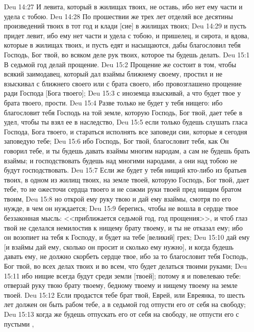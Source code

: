\vs Deu 14:27 И левита, который в жилищах твоих, не оставь, ибо нет ему части и удела с тобою.
\vs Deu 14:28 По прошествии же трех лет отделяй все десятины произведений твоих в тот год и клади [сие] в жилищах твоих;
\vs Deu 14:29 и пусть придет левит, ибо ему нет части и удела с тобою, и пришелец, и сирота, и вдова, которые  в жилищах твоих, и пусть едят и насыщаются, дабы благословил тебя Господь, Бог твой, во всяком деле рук твоих, которое ты будешь делать.
\vs Deu 15:1 В седьмой год делай прощение.
\vs Deu 15:2 Прощение же состоит в том, чтобы всякий заимодавец, который дал взаймы ближнему своему, простил  и не взыскивал с ближнего своего или с брата своего, ибо провозглашено прощение ради Господа [Бога твоего];
\vs Deu 15:3 с иноземца взыскивай, а что будет твое у брата твоего, прости.
\vs Deu 15:4 Разве только не будет у тебя нищего: ибо благословит тебя Господь на той земле, которую Господь, Бог твой, дает тебе в удел, чтобы ты взял ее в наследство,
\vs Deu 15:5 если только будешь слушать гласа Господа, Бога твоего, и стараться исполнять все заповеди сии, которые я сегодня заповедую тебе;
\vs Deu 15:6 ибо Господь, Бог твой, благословит тебя, как Он говорил тебе, и ты будешь давать взаймы многим народам, а сам не будешь брать взаймы; и господствовать будешь над многими народами, а они над тобою не будут господствовать.
\vs Deu 15:7 Если же будет у тебя нищий кто-либо из братьев твоих, в одном из жилищ твоих, на земле твоей, которую Господь, Бог твой, дает тебе, то не ожесточи сердца твоего и не сожми руки твоей пред нищим братом твоим,
\vs Deu 15:8 но открой ему руку твою и дай ему взаймы, смотря по его нужде, в чем он нуждается;
\vs Deu 15:9 берегись, чтобы не вошла в сердце твое беззаконная мысль: <<приближается седьмой год, год прощения>>, и чтоб  глаз твой не сделался немилостив к нищему брату твоему, и ты не отказал ему; ибо он возопиет на тебя к Господу, и будет на тебе [великий] грех;
\vs Deu 15:10 дай ему [и взаймы дай ему, сколько он просит и сколько ему нужно], и когда будешь давать ему, не должно скорбеть сердце твое, ибо за то благословит тебя Господь, Бог твой, во всех делах твоих и во всем, что будет делаться твоими руками;
\vs Deu 15:11 ибо нищие всегда будут среди земли [твоей]; потому я и повелеваю тебе: отверзай руку твою брату твоему, бедному твоему и нищему твоему на земле твоей.
\vs Deu 15:12 Если продастся тебе брат твой, Еврей, или Евреянка, то шесть лет должен он быть рабом тебе, а в седьмой год отпусти его от себя на свободу;
\vs Deu 15:13 когда же будешь отпускать его от себя на свободу, не отпусти его с пустыми ,
